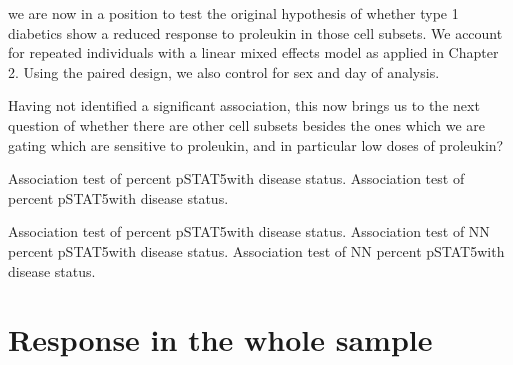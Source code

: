 we are now in a position to test
the original hypothesis of whether type 1 diabetics show a reduced response to proleukin in those cell subsets.
We account for repeated individuals with a linear mixed effects model as applied in Chapter 2.%
Using the paired design, we also control for sex and day of analysis.

Having not identified a significant association, this now brings us to the next question of whether there are other
cell subsets besides the ones which we are gating which are sensitive to proleukin, and in particular low doses of proleukin?
%

{ Association test of percent pSTAT5\positive with disease status. }
{ }
{ Association test of percent pSTAT5\positive with disease status. }
{ }

{ Association test of percent pSTAT5\positive with disease status. }
{ }
{ Association test of NN percent pSTAT5\positive with disease status. }
{ } 
{ Association test of NN percent pSTAT5\positive with disease status. }
{ }

\section{Response in the whole sample}

